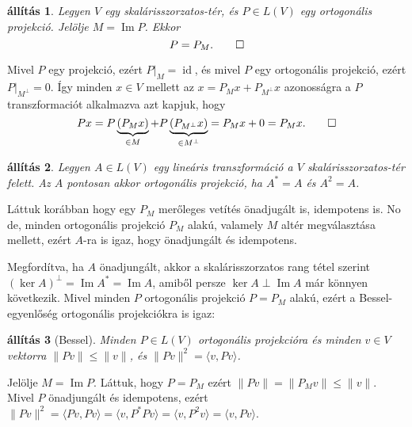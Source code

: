 \documentclass[a4paper, showtrims]{memoir}
\makeatletter
\renewenvironment{proof}[1][\proofname]
    {\par\pushQED{\qed}%
    \normalfont \topsep6\p@\@plus6\p@\relax
    \trivlist
    \item[\hskip\labelsep
        \itshape
    #1\@addpunct{:}]\ignorespaces}
    {\popQED\endtrivlist\@endpefalse}
\theoremstyle{plain}
\newtheorem{proposition}{állítás}[chapter]
\theoremstyle{remark}
\theoremstyle{definition}
\DeclareMathOperator{\id}{id}
\DeclareMathOperator{\im}{Im}
\newcommand{\ip}[2]{\langle#1,#2\rangle}
\makeatother
\begin{document}
\begin{proposition}
	Legyen $V$ egy skalárisszorzatos-tér,
	és $P\in L\left( V \right)$ egy ortogonális projekció.
	Jelölje $M=\im P$.
	Ekkor
	\[
		P=P_M.
		\qedhere
	\]
\end{proposition}
\begin{proof}
    Mivel $P$ egy projekció, ezért $P|_M=\id$, és mivel $P$ egy ortogonális projekció, 
    ezért $P|_{M^\perp}=0$.
    Így minden $x\in V$ mellett az $x=P_Mx+P_{M^\perp}x$ azonosságra a $P$ transzformaciót alkalmazva azt kapjuk, hogy
    \[
        Px
        =
        P\underbrace{\left( P_Mx \right)}_{\in M}+P\underbrace{\left( P_{M^\perp}x \right)}_{\in M^\perp}
        =
        P_Mx+0
        =
        P_Mx.
        \qedhere
    \]
\end{proof}
\begin{proposition}
	Legyen $A\in L\left( V \right)$ egy lineáris transzformáció a $V$ skalárisszorzatos-tér felett.
	Az $A$ pontosan akkor ortogonális projekció, ha $A^\ast=A$ és $A^2=A$.
\end{proposition}
\begin{proof}
	Láttuk korábban hogy egy $P_M$ merőleges vetítés önadjugált is, idempotens is.
	No de, minden ortogonális projekció $P_M$ alakú,
	valamely $M$ altér megválasztása mellett, ezért $A$-ra is igaz, hogy önadjungált és idempotens.

	Megfordítva, ha $A$ önadjungált, akkor a skalárisszorzatos rang tétel szerint $(\ker A)^\perp=\im A^\ast=\im A$,
	amiből persze $\ker A\perp\im A$ már könnyen következik.
\end{proof}
Mivel minden $P$ ortogonális projekció $P=P_M$ alakú,
ezért a Bessel-egyenlőség ortogonális projekciókra is igaz:
\begin{proposition}[Bessel]
	Minden  $P\in L\left( V \right)$ ortogonális projekcióra és minden $v\in V$ vektorra
	\(
	\|Pv\|\leq\|v\|
	\),
    és
    \(
    \|Pv\|^2=\ip{v}{Pv}
    \).
\end{proposition}
\begin{proof}
	Jelölje $M=\im P$.
    Láttuk, hogy $P=P_M$ ezért
	\(
	\|Pv\|
	=
	\|P_Mv\|
	\leq
	\|v\|.
	\)
    Mivel $P$ önadjungált és idempotens, 
    ezért
    \(
    \|Pv\|^2=\ip{Pv}{Pv}=\ip{v}{P^\ast Pv}=\ip{v}{P^2v}=\ip{v}{Pv}
    \).
\end{proof}
\end{document}
